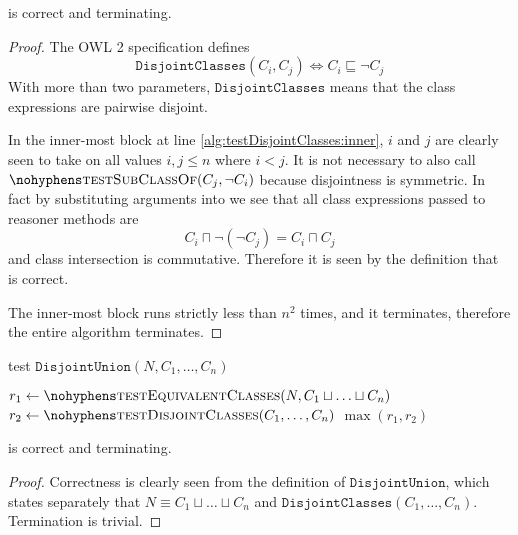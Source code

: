 \documentclass[paper.tex]{subfiles}
\begin{document}
\begin{theorem}
   is correct and terminating.
\end{theorem}
\begin{proof}
  The OWL 2 specification \cite{W3C:OWL2Syntax} defines
  \[ \mathtt{DisjointClasses}(C_i, C_j) \iff C_i \sqsubseteq \neg C_j \]
  With more than two parameters, $\mathtt{DisjointClasses}$ means that the class expressions are pairwise disjoint.

  In the inner-most block at line \ref{alg:testDisjointClasses:inner}, $i$ and $j$ are clearly seen to take on all values $i, j \le n$ where $i < j$.
  It is not necessary to also call $\textproc{testSubClassOf}(C_j, \neg C_i)$ because disjointness is symmetric.  In fact by substituting arguments into  we see that all class expressions passed to reasoner methods are
  \[ C_i \sqcap \neg (\neg C_j) = C_i \sqcap C_j \]
  and class intersection is commutative.  Therefore it is seen by the definition that  is correct.  \todo[unconvincing]

  The inner-most block runs strictly less than $n^2$ times, and it terminates, therefore the entire algorithm terminates.
\end{proof}


\begin{algorithm}[H]
  \caption{test $\mathtt{DisjointUnion}(N, C_1, \ldots, C_n)$}
  \begin{algorithmic}[1]
    \raggedright
      \State $r_1 \gets \Call{testEquivalentClasses}{N, C_1 \sqcup \ldots \sqcup C_n}$
      \State $r_2 \gets \Call{testDisjointClasses}{C_1, \ldots, C_n}$
      \State \Return $\max(r_1, r_2)$
    \EndFunction
  \end{algorithmic}
\end{algorithm}

\begin{theorem}
   is correct and terminating.
\end{theorem}
\begin{proof}
  Correctness is clearly seen from the definition of $\mathtt{DisjointUnion}$, which states separately that $N \equiv C_1 \sqcup \ldots \sqcup C_n$ and $\mathtt{DisjointClasses}(C_1, \ldots, C_n)$.  Termination is trivial.
\end{proof}
\end{document}
